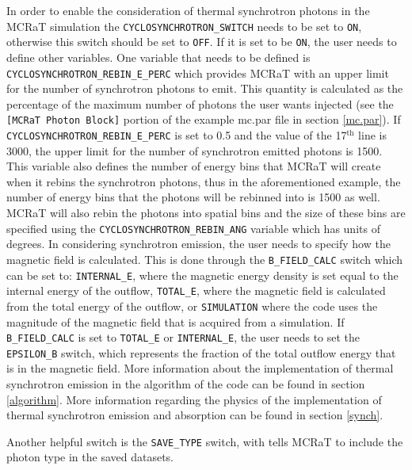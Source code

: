 \documentclass[12pt,a4paper]{article}
\begin{document}
In order to enable the consideration of thermal synchrotron photons in the MCRaT simulation the \texttt{CYCLOSYNCHROTRON\_SWITCH} needs to be set to \texttt{ON}, otherwise this switch should be set to \texttt{OFF}. If it is set to be \texttt{ON}, the user needs to define other variables. One variable that needs to be defined is \texttt{CYCLOSYNCHROTRON\_REBIN\_E\_PERC} which provides MCRaT with an upper limit for the number of synchrotron photons to emit. This quantity is calculated as the percentage of the maximum number of photons the user wants injected (see the \texttt{[MCRaT Photon Block]} portion of the example mc.par file in section \ref{mc.par}). If \texttt{CYCLOSYNCHROTRON\_REBIN\_E\_PERC} is set to 0.5 and the value of the 17$^\textrm{th}$ line is 3000, the upper limit for the number of synchrotron emitted photons is 1500. This variable also defines the number of energy bins that MCRaT will create when it rebins the synchrotron photons, thus in the aforementioned example, the number of energy bins that the photons will be rebinned into is 1500 as well. MCRaT will also rebin the photons into spatial bins and the size of these bins are specified using the \texttt{CYCLOSYNCHROTRON\_REBIN\_ANG} variable which has units of degrees. In considering synchrotron emission, the user needs to specify how the magnetic field is calculated. This is done through the \texttt{B\_FIELD\_CALC} switch which can be set to: \texttt{INTERNAL\_E}, where the magnetic energy density is set equal to the internal energy of the outflow, \texttt{TOTAL\_E}, where the magnetic field is calculated from the total energy of the outflow, or \texttt{SIMULATION} where the code uses the magnitude of the magnetic field that is acquired from a simulation. If \texttt{B\_FIELD\_CALC} is set to \texttt{TOTAL\_E} or \texttt{INTERNAL\_E}, the user needs to set the \texttt{EPSILON\_B} switch, which represents the fraction of the total outflow energy that is in the magnetic field. More information about the implementation of thermal synchrotron emission in the algorithm of the code can be found in section \ref{algorithm}. More information regarding the physics of the implementation of thermal synchrotron emission and absorption can be found in section \ref{synch}. 

Another helpful switch is the \texttt{SAVE\_TYPE} switch, with tells MCRaT to include the photon type in the saved datasets. 
\end{document}

